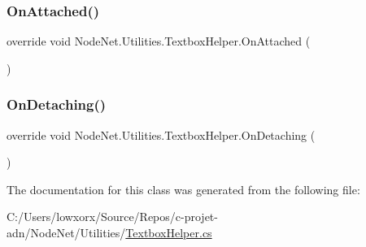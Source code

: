 \subsubsection{\texorpdfstring{On\+Attached()}{OnAttached()}}
{\footnotesize\ttfamily override void Node\+Net.\+Utilities.\+Textbox\+Helper.\+On\+Attached (\begin{DoxyParamCaption}{ }\end{DoxyParamCaption})\hspace{0.3cm}{\ttfamily [protected]}}

\mbox{\label{class_node_net_1_1_utilities_1_1_textbox_helper_ad52f874199c2af86700bb9cdb3f80f76}} 
\subsubsection{\texorpdfstring{On\+Detaching()}{OnDetaching()}}
{\footnotesize\ttfamily override void Node\+Net.\+Utilities.\+Textbox\+Helper.\+On\+Detaching (\begin{DoxyParamCaption}{ }\end{DoxyParamCaption})\hspace{0.3cm}{\ttfamily [protected]}}



The documentation for this class was generated from the following file\+:\begin{DoxyCompactItemize}
\item 
C\+:/\+Users/lowxorx/\+Source/\+Repos/c-\/projet-\/adn/\+Node\+Net/\+Utilities/\hyperlink{_textbox_helper_8cs}{Textbox\+Helper.\+cs}\end{DoxyCompactItemize}
